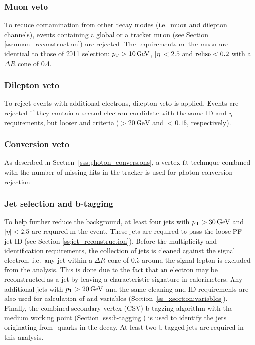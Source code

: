 \subsubsection*{Muon veto}
To reduce contamination from other \ttbar decay modes (i.e.\ muon and dilepton channels), events containing a global or
a tracker muon (see Section \ref{ss:muon_reconstruction}) are rejected. The requirements on the muon are identical to
those of 2011 selection: $\pt > \SI{10}{\GeV}$, $|\eta| < 2.5$ and $\textrm{reliso} < 0.2$ with a $\Delta R$ cone of \num{0.4}.

\subsubsection*{Dilepton veto}
To reject events with additional electrons, dilepton veto is applied. Events are rejected if they contain a second
electron candidate with the same ID and $\eta$ requirements, but looser \ET and \reliso criteria ($>\SI{20}{\GeV}$ and
$<0.15$, respectively).

\subsubsection*{Conversion veto}
As described in Section~\ref{sss:photon_conversions}, a vertex fit technique combined with the number of missing hits
in the tracker is used for photon conversion rejection.

\subsubsection*{Jet selection and b-tagging}
To help further reduce the background, at least four jets with $\pt > \SI{30}{\GeV}$ and $|\eta| < 2.5$ are required in
the event. These jets are required to pass the loose PF jet ID (see Section \ref{ss:jet_reconstruction}). Before the
multiplicity and identification requirements, the collection of jets is cleaned against the signal electron, i.e.\ any
jet within a $\Delta R$ cone of \num{0.3} around the signal lepton is excluded from the analysis. This is done due to
the fact that an electron may be reconstructed as a jet by leaving a characteristic signature in calorimeters. Any
additional jets with $\pt > \SI{20}{\GeV}$ and the same cleaning and ID requirements are also used for calculation of
\HT and \ST variables (Section~\ref{ss_xsection:variables}). Finally, the combined secondary vertex (CSV) b-tagging
algorithm with the medium working point (Section \ref{sss:b-tagging}) is used to identify the jets originating from
\cPqb-quarks in the \ttbar decay. At least two b-tagged jets are required in this analysis.

